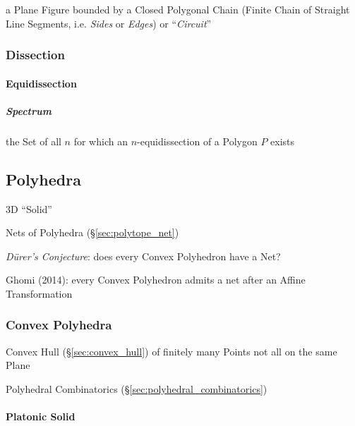 a Plane Figure bounded by a Closed Polygonal Chain (Finite Chain of Straight
Line Segments, i.e. \emph{Sides} or \emph{Edges}) or ``\emph{Circuit}''



\subsubsection{Dissection}\label{sec:dissection}

\paragraph{Equidissection}\label{sec:equidissection}\hfill

\subparagraph{Spectrum}\label{sec:polygon_spectrum}\hfill

the Set of all $n$ for which an $n$-equidissection of a Polygon $P$ exists



\subsection{Polyhedra}\label{sec:polyhedra}

3D ``Solid''

Nets of Polyhedra (\S\ref{sec:polytope_net})

\emph{D\"urer's Conjecture}: does every Convex Polyhedron have a Net?

Ghomi (2014): every Convex Polyhedron admits a net after an Affine
Transformation



\subsubsection{Convex Polyhedra}\label{sec:convex_polyhedra}

Convex Hull (\S\ref{sec:convex_hull}) of finitely many Points not all on the
same Plane

\fist Polyhedral Combinatorics (\S\ref{sec:polyhedral_combinatorics})



\paragraph{Platonic Solid}\label{sec:platonic_solid}\hfill

